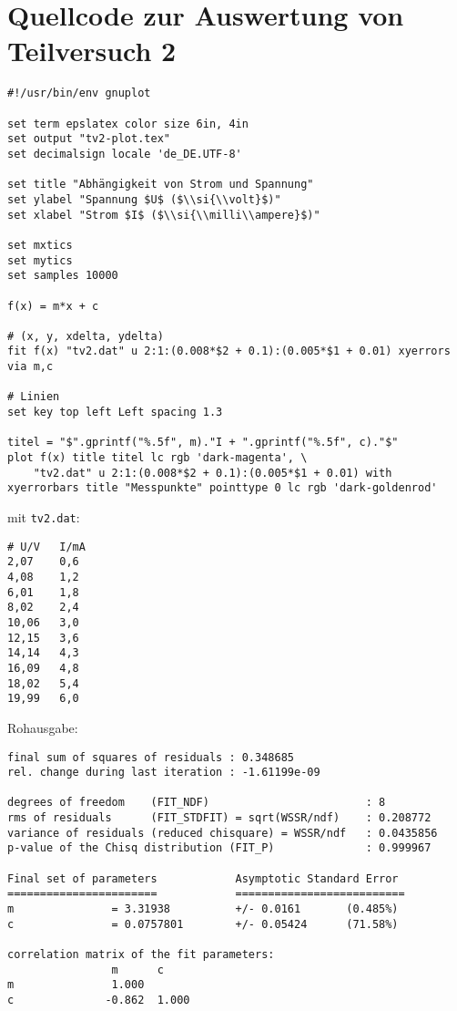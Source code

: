\section{\gnuplot{} Quellcode zur Auswertung von Teilversuch 2}
    \label{appdx:gnuplottv2}
    {  
        \renewcommand{\fcolorbox}[4][]{#4}
        \begin{verbatim}
#!/usr/bin/env gnuplot

set term epslatex color size 6in, 4in
set output "tv2-plot.tex"
set decimalsign locale 'de_DE.UTF-8'

set title "Abhängigkeit von Strom und Spannung"
set ylabel "Spannung $U$ ($\\si{\\volt}$)"
set xlabel "Strom $I$ ($\\si{\\milli\\ampere}$)"

set mxtics
set mytics
set samples 10000

f(x) = m*x + c

# (x, y, xdelta, ydelta)
fit f(x) "tv2.dat" u 2:1:(0.008*$2 + 0.1):(0.005*$1 + 0.01) xyerrors via m,c

# Linien
set key top left Left spacing 1.3

titel = "$".gprintf("%.5f", m)."I + ".gprintf("%.5f", c)."$"
plot f(x) title titel lc rgb 'dark-magenta', \
    "tv2.dat" u 2:1:(0.008*$2 + 0.1):(0.005*$1 + 0.01) with xyerrorbars title "Messpunkte" pointtype 0 lc rgb 'dark-goldenrod'
        \end{verbatim}
    }
    mit \texttt{tv2.dat}:
    \begin{multicols}{2}
        \begin{verbatim}
# U/V   I/mA
2,07    0,6
4,08    1,2
6,01    1,8
8,02    2,4
10,06   3,0
12,15   3,6
14,14   4,3
16,09   4,8
18,02   5,4
19,99   6,0
        \end{verbatim}
    \end{multicols}
    \vspace{-\baselineskip}
    Rohausgabe:
    \begin{verbatim}
final sum of squares of residuals : 0.348685
rel. change during last iteration : -1.61199e-09

degrees of freedom    (FIT_NDF)                        : 8
rms of residuals      (FIT_STDFIT) = sqrt(WSSR/ndf)    : 0.208772
variance of residuals (reduced chisquare) = WSSR/ndf   : 0.0435856
p-value of the Chisq distribution (FIT_P)              : 0.999967

Final set of parameters            Asymptotic Standard Error
=======================            ==========================
m               = 3.31938          +/- 0.0161       (0.485%)
c               = 0.0757801        +/- 0.05424      (71.58%)

correlation matrix of the fit parameters:
                m      c      
m               1.000 
c              -0.862  1.000 
    \end{verbatim}
